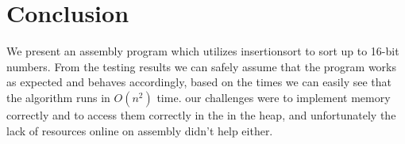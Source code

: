 \section{Conclusion}
We present an assembly program which utilizes insertionsort to sort up to 16-bit numbers.
From the testing results we can safely assume that the program works as expected and behaves accordingly, based on the times we can easily see that the algorithm runs in $O(n^2)$ time.
our challenges were to implement memory correctly and to access them correctly in the in the heap, and unfortunately the lack of resources online on assembly didn't help either.
  
